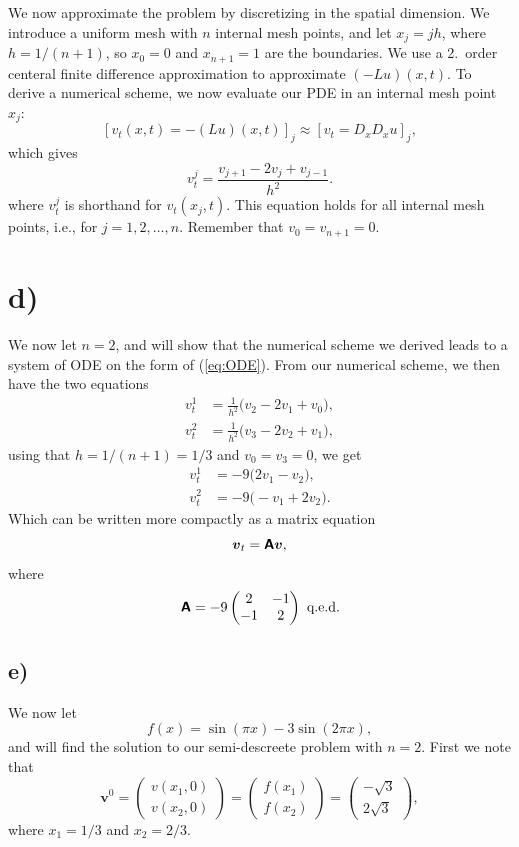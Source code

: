\documentclass[a4paper, 11pt, notitlepage, english]{article}
\newcommand{\bt}[1]{\boldsymbol{#1}}
\newcommand{\mat}[1]{\textsf{\textbf{#1}}}
\begin{document}
We now approximate the problem by discretizing in the spatial dimension. We introduce a uniform mesh with $n$ internal mesh points, and let $x_j = jh$, where $h=1/(n+1)$, so $x_0 = 0$ and $x_{n+1} = 1$ are the boundaries. We use a 2.\ order centeral finite difference approximation to approximate $(-Lu)(x,t)$. To derive a numerical scheme, we now evaluate our PDE in an internal mesh point $x_j$:
$$[v_t(x,t) = -(Lu)(x,t)]_j \approx [v_t = D_x D_x u]_j,$$
which gives
$$v^j_t = \frac{v_{j+1} - 2v_j + v_{j-1}}{h^2}.$$
where $v^j_t$ is shorthand for $v_t(x_j, t)$. This equation holds for all internal mesh points, i.e., for $j=1,2,\ldots, n$. Remember that $v_0 = v_{n+1} = 0.$

\section*{d)}
We now let $n=2$, and will show that the numerical scheme we derived leads to a system of ODE on the form of (\ref{eq:ODE}). From our numerical scheme, we then have the two equations
\begin{align*}
v_t^1 &= \frac{1}{h^2}\big(v_2 - 2v_1 + v_0 \big), \\
v_t^2 &= \frac{1}{h^2}\big(v_3 - 2v_2 + v_1 \big),
\end{align*}
using that $h=1/(n+1) = 1/3$ and $v_0 = v_3 = 0$, we get
\begin{align*}
v_t^1 &= -9\big(2v_1 -v_2 \big), \\
v_t^2 &= -9\big(-v_1 + 2v_2 \big). 
\end{align*}
Which can be written more compactly as a matrix equation
$$\bt{v}_t = \mat{A}\bt{v},$$
where
$$ \mat{A} = -9\begin{pmatrix} 2 & -1 \\ -1 & 2 \end{pmatrix} \mbox{ q.e.d.} $$

\subsection*{e)}
We now let
$$f(x) = \sin(\pi x) - 3\sin(2\pi x),$$
and will find the solution to our semi-descreete problem with $n=2$. First we note that
$$\bt{v}^0 = \begin{pmatrix} v(x_1,0) \\ v(x_2,0) \end{pmatrix} = \begin{pmatrix} f(x_1) \\ f(x_2) \end{pmatrix} = \begin{pmatrix}
    -\sqrt{3} \\ 2\sqrt{3}  
\end{pmatrix},$$
where $x_1 = 1/3$ and $x_2 = 2/3$.
\end{document}
